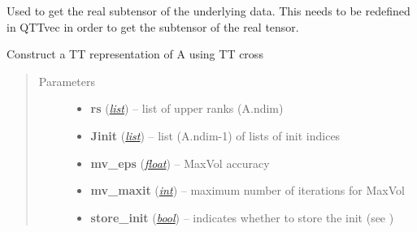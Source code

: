 \documentclass[a4paper,10pt,english]{sphinxmanual}
\begin{document}
\begin{fulllineitems}
\begin{fulllineitems}
\end{fulllineitems}


\begin{fulllineitems}
\label{api-ttvec:TensorToolbox.core.TTvec.get_ttdmrg_real_subtensor}
Used to get the real subtensor of the underlying data.
This needs to be redefined in QTTvec in order to get the subtensor of the real tensor.

\end{fulllineitems}


\begin{fulllineitems}
\label{api-ttvec:TensorToolbox.core.TTvec.inner_ttcross}
Construct a TT representation of A using TT cross
\begin{quote}\begin{description}
\item[{Parameters}] \leavevmode\begin{itemize}
\item {} 
\textbf{rs} (\href{http://docs.python.org/library/functions.html\#list}{\emph{list}}) -- list of upper ranks (A.ndim)

\item {} 
\textbf{Jinit} (\href{http://docs.python.org/library/functions.html\#list}{\emph{list}}) -- list (A.ndim-1) of lists of init indices

\item {} 
\textbf{mv\_eps} (\href{http://docs.python.org/library/functions.html\#float}{\emph{float}}) -- MaxVol accuracy

\item {} 
\textbf{mv\_maxit} (\href{http://docs.python.org/library/functions.html\#int}{\emph{int}}) -- maximum number of iterations for MaxVol

\item {} 
\textbf{store\_init} (\href{http://docs.python.org/library/functions.html\#bool}{\emph{bool}}) -- indicates whether to store the init  (see )

\end{itemize}


\end{description}
\end{quote}
\end{fulllineitems}
\end{fulllineitems}
\end{document}
